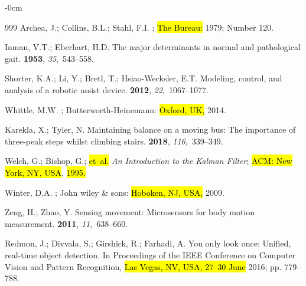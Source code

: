 \documentclass[actuators,article,accept,pdftex,moreauthors]{Definitions/mdpi}
\begin{document}
\begin{adjustwidth}{-\extralength}{0cm}
\begin{thebibliography}{999}
Archea, J.; Collins, B.L.; Stahl, F.I.
;  \hl{The Bureau:   } %
1979; Number 120.

Inman, V.T.; Eberhart, H.D.
\newblock The major determinants in normal and pathological gait.
 {\bf 1953}, {\em 35},~543--558.

Shorter, K.A.; Li, Y.; Bretl, T.; Hsiao-Wecksler, E.T.
\newblock Modeling, control, and analysis of a robotic assist device.
 {\bf 2012}, {\em 22},~1067--1077.

Whittle, M.W.
; Butterworth-Heinemann: \hl{Oxford, UK,} %
  2014.

Karekla, X.; Tyler, N.
\newblock Maintaining balance on a moving bus: The importance of three-peak
  steps whilst climbing stairs.
 {\bf 2018},
  {\em 116},~339--349.

Welch, G.; Bishop, G.;  \hl{et~al.} %
\newblock \emph{An Introduction to the Kalman Filter}; \hl{ACM: New York, NY, USA}, \hl{{1995}.} 


Winter, D.A.
; John wiley \&
  sons:  \hl{Hoboken, NJ, USA,} %
  2009.

Zeng, H.; Zhao, Y.
\newblock Sensing movement: Microsensors for body motion measurement.
 {\bf 2011}, {\em 11},~638--660.

Redmon, J.; Divvala, S.; Girshick, R.; Farhadi, A.
\newblock You only look once: Unified, real-time object detection.
\newblock In Proceedings of the  IEEE Conference on Computer
  Vision and Pattern Recognition,\hl{ Las Vegas, NV, USA, 27--30 June } %
  2016; pp. 779--788.


\end{thebibliography}
\end{adjustwidth}
\end{document}
